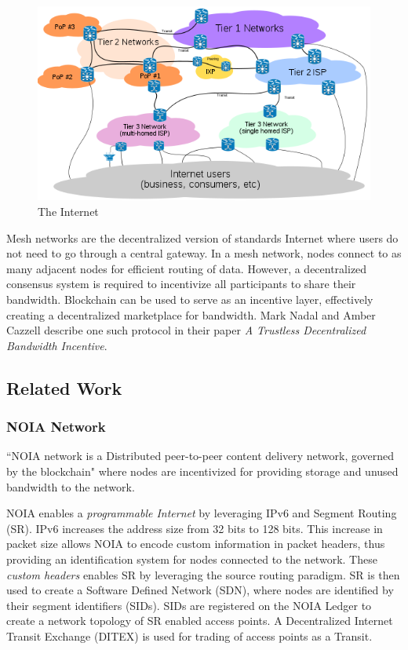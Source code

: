 	\begin{figure}[h]
		\includegraphics[width=\linewidth]{figures/internet-backbone}
		\caption{\label{fig:internet-backbone} The Internet\protect\cite{image:internet:1}}
	\end{figure}
	
	Mesh networks are the decentralized version of standards Internet where users do not need to go through a central gateway. In a mesh network, nodes connect to as many adjacent nodes for efficient routing of data. However, a decentralized consensus system is required to incentivize all participants to share their bandwidth. Blockchain can be used to serve as an incentive layer, effectively creating a decentralized marketplace for bandwidth. Mark Nadal and Amber Cazzell describe one such protocol in their paper \textit{A Trustless Decentralized Bandwidth Incentive}\cite{nadal2019amber}.
	
	\subsection{Related Work}
		\subsubsection{NOIA Network}
		``NOIA\cite{noia:doc:cache:1} network is a Distributed peer-to-peer content delivery network, governed by the blockchain" where nodes are incentivized for providing storage and unused bandwidth to the network.
		
		NOIA enables a \textit{programmable Internet}\cite{noia:whitepaper:1} by leveraging IPv6 and Segment Routing (SR). IPv6 increases the address size from 32 bits to 128 bits. This increase in packet size allows NOIA to encode custom information in packet headers, thus providing an identification system for nodes connected to the network. These \textit{custom headers}\cite{noia:doc:ipv6:1} enables SR by leveraging the source routing paradigm. SR is then used to create a Software Defined Network (SDN), where nodes are identified by their segment identifiers (SIDs). SIDs are registered on the NOIA Ledger to create a network topology of SR enabled access points. A Decentralized Internet Transit Exchange (DITEX) is used for trading of access points as a Transit.
		
